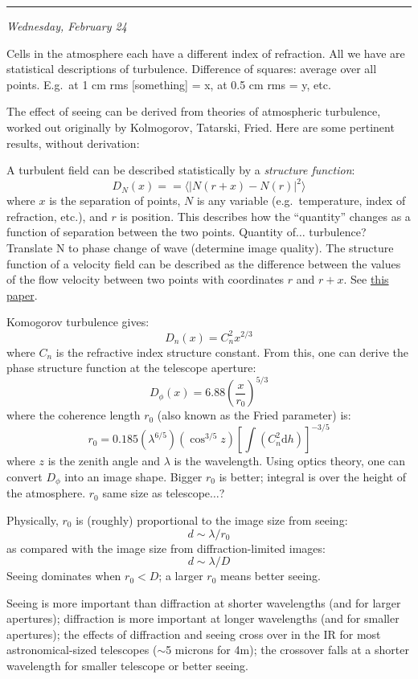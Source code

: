 \documentclass[12pt]{article}
\newcommand{\mynotes}[1]{\textcolor{myBlue}{#1}}
\newcommand{\mydate}[1]{
    \begin{flushright}
        \rule{\textwidth}{0.4pt} %
        \small\hfill\textit{#1}
    \end{flushright}}
\begin{document}
\mydate{Wednesday, February 24}

\mynotes{Cells in the atmosphere each have a different index of refraction. All
we have are statistical descriptions of turbulence. Difference of squares:
average over all points. E.g.\ at 1 cm rms [something] = x, at 0.5 cm rms = y,
etc.}

The effect of seeing can be derived from theories of atmospheric turbulence,
worked out originally by Kolmogorov, Tatarski, Fried. Here are some pertinent
results, without derivation:

A turbulent field can be described statistically by a \textit{structure
function}:
\[
    D_{N}(x) = = \langle | N(r+x) - N(r) | ^{2} \rangle
    \]
where $x$ is the separation of points, $N$ is any variable (e.g.\ temperature,
index of refraction, etc.), and $r$ is position.
\mynotes{This describes how the
``quantity'' changes as a function of separation between the two points.
Quantity of$\ldots$ turbulence?
Translate N to phase change of wave (determine image quality).
The structure function of a velocity field can be described as the
difference between the values of the flow velocity between two points
with coordinates $r$ and $r+x$. See \href{http://jetp.ac.ru/cgi-bin/dn/e_082_03_0580.pdf}
{this paper}.}

Komogorov turbulence gives:
\[
    D_{n}(x) = C_{n}^{2}x^{2/3}
    \]
where $C_{n}$ is the refractive index structure constant. From this, one can
derive the phase structure function at the telescope aperture:
\[
    D_{\phi}(x) = 6.88 \left( \frac{x}{r_{0}} \right) ^{5/3}
    \]
where the coherence length $r_{0}$ (also known as the Fried parameter) is:
\[
    r_{0} = 0.185\left( \lambda^{6/5} \right)
    \left( \cos^{3/5}z \right)
    \left[ \int \left( C_{n}^{2}\textrm{d}h \right)\right]^{-3/5}
    \]
where $z$ is the zenith angle and $\lambda$ is the wavelength.
Using optics theory, one can convert $D_{\phi}$ into an image shape.
\mynotes{Bigger $r_{0}$ is better; integral is over the height
of the atmosphere. $r_{0}$ same size as telescope$\ldots$?}

Physically, $r_{0}$ is (roughly) proportional to the image size from
seeing:
\[
    d \sim \lambda/r_{0}
    \]
as compared with the image size from diffraction-limited images:
\[
    d \sim \lambda/D
    \]
Seeing dominates when $r_{0} < D$; a larger $r_{0}$ means better seeing.

Seeing is more important than diffraction at shorter wavelengths (and for
larger apertures); diffraction is more important at longer wavelengths (and for
smaller apertures); the effects of diffraction and seeing cross over in the IR
for most astronomical-sized telescopes ($\sim$5 microns for 4m); the crossover
falls at a shorter wavelength for smaller telescope or better seeing.
\end{document}
